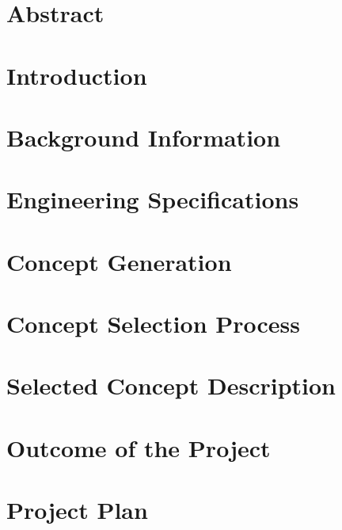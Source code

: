 






\clearpage

\tableofcontents
\clearpage

\section{Abstract}


\section{Introduction}


\section{Background Information}


\section{Engineering Specifications}


\section{Concept Generation}


\section{Concept Selection Process}


\section{Selected Concept Description}


\section{Outcome of the Project}


\section{Project Plan}
\label{sec:contribution}


